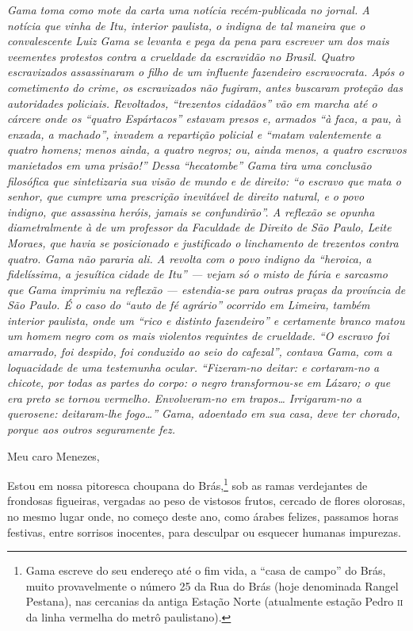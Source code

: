 {\begin{resumo}
\emph{Gama toma como mote da carta uma notícia recém-publicada no
jornal. A notícia que vinha de Itu, interior paulista, o indigna de tal
maneira que o convalescente Luiz Gama se levanta e pega da pena para
escrever um dos mais veementes protestos contra a crueldade da
escravidão no Brasil. Quatro escravizados assassinaram o filho de um
influente fazendeiro escravocrata. Após o cometimento do crime, os
escravizados não fugiram, antes buscaram proteção das autoridades
policiais. Revoltados, ``trezentos cidadãos'' vão em marcha até o cárcere
onde os ``quatro Espártacos'' estavam presos e, armados ``à faca, a pau, à
enxada, a machado'', invadem a repartição policial e ``matam valentemente
a quatro homens; menos ainda, a quatro negros; ou, ainda menos, a quatro
escravos manietados em uma prisão!'' Dessa ``hecatombe'' Gama tira uma
conclusão filosófica que sintetizaria sua visão de mundo e de direito:
``o escravo que mata o senhor, que cumpre uma prescrição inevitável de
direito natural, e o povo indigno, que assassina heróis, jamais se
confundirão''. A reflexão se opunha diametralmente à de um professor da
Faculdade de Direito de São Paulo, Leite Moraes, que havia se
posicionado e justificado o linchamento de trezentos contra quatro. Gama
não pararia ali. A revolta com o povo indigno da ``heroica, a
fidelíssima, a jesuítica cidade de Itu'' --- vejam só o misto de fúria e
sarcasmo que Gama imprimiu na reflexão --- estendia-se para outras praças
da província de São Paulo. É o caso do ``auto de fé agrário'' ocorrido em
Limeira, também interior paulista, onde um ``rico e distinto fazendeiro''
e certamente branco matou um homem negro com os mais violentos requintes
de crueldade. ``O escravo foi amarrado, foi despido, foi conduzido ao
seio do cafezal'', contava Gama, com a loquacidade de uma testemunha
ocular. ``Fizeram-no deitar: e cortaram-no a chicote, por todas as partes
do corpo: o negro transformou-se em Lázaro; o que era preto se tornou
vermelho. Envolveram-no em trapos\ldots{} Irrigaram-no a querosene:
deitaram-lhe fogo\ldots{}'' Gama, adoentado em sua casa, deve ter chorado,
porque aos outros seguramente fez. }
\end{resumo}

Meu caro Menezes,

Estou em nossa pitoresca choupana do Brás,\footnote{Gama escreve do
  seu endereço até o fim vida, a ``casa de campo'' do Brás, muito
  provavelmente o número 25 da Rua do Brás (hoje denominada Rangel
  Pestana), nas cercanias da antiga Estação Norte (atualmente estação
  Pedro \textsc{ii} da linha vermelha do metrô paulistano).} sob as ramas
verdejantes de frondosas figueiras, vergadas ao peso de vistosos frutos,
cercado de flores olorosas, no mesmo lugar onde, no começo deste ano,
como árabes felizes, passamos horas festivas, entre sorrisos inocentes,
para desculpar ou esquecer humanas impurezas.

}
